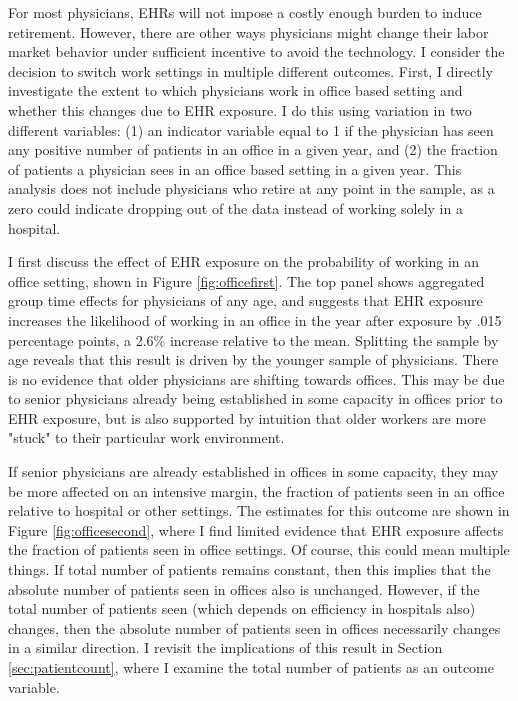 \documentclass[11pt]{article}
\begin{document}
For most physicians, EHRs will not impose a costly enough burden to induce retirement. However, there are other ways physicians might change their labor market behavior under sufficient incentive to avoid the technology. I consider the decision to switch work settings in multiple different outcomes. First, I directly investigate the extent to which physicians work in office based setting and whether this changes due to EHR exposure. I do this using variation in two different variables: (1) an indicator variable equal to 1 if the physician has seen any positive number of patients in an office in a given year, and (2) the fraction of patients a physician sees in an office based setting in a given year. This analysis does not include physicians who retire at any point in the sample, as a zero could indicate dropping out of the data instead of working solely in a hospital. 

I first discuss the effect of EHR exposure on the probability of working in an office setting, shown in Figure \ref{fig:officefirst}. The top panel shows aggregated group time effects for physicians of any age, and suggests that EHR exposure increases the likelihood of working in an office in the year after exposure by .015 percentage points, a 2.6\% increase relative to the mean. Splitting the sample by age reveals that this result is driven by the younger sample of physicians. There is no evidence that older physicians are shifting towards offices. This may be due to senior physicians already being established in some capacity in offices prior to EHR exposure, but is also supported by intuition that older workers are more "stuck" to their particular work environment. 

If senior physicians are already established in offices in some capacity, they may be more affected on an intensive margin, the fraction of patients seen in an office relative to hospital or other settings. The estimates for this outcome are shown in Figure \ref{fig:officesecond}, where I find limited evidence that EHR exposure affects the fraction of patients seen in office settings. Of course, this could mean multiple things. If total number of patients remains constant, then this implies that the absolute number of patients seen in offices also is unchanged. However, if the total number of patients seen (which depends on efficiency in hospitals also) changes, then the absolute number of patients seen in offices necessarily changes in a similar direction. I revisit the implications of this result in Section \ref{sec:patientcount}, where I examine the total number of patients as an outcome variable.
\end{document}
